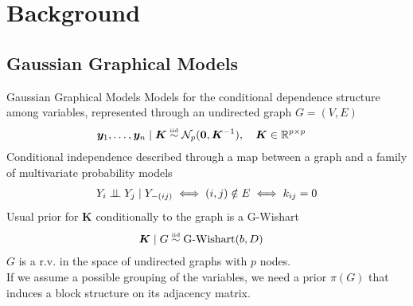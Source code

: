 

\section{Background}

\subsection{Gaussian Graphical Models}
\begin{frame}{Gaussian Graphical Models}
    Models for the \alert{conditional dependence structure} among variables, represented through an undirected graph $G=(V,E)$
    \begin{align*}
    \bm{y}_{1}, \ldots, \bm{y}_{n} \mid \bm{K} &\iid \mathcal{N}_{p}(\bm{0},\bm{K}^{-1}), \quad \bm{K} \in \mathbb{R}^{p\times p}  %
    \end{align*}
Conditional independence described through a \alert{map} between a \alert{graph} and a family of multivariate \alert{probability models}
\begin{align*}
Y_{i}\perp \!\!\! \perp Y_{j} \mid Y_{-(ij)} \iff (i,j) \notin E \iff k_{ij}=0
\end{align*}
Usual prior for $\bm{K}$ conditionally to the graph is a G-Wishart
\begin{align*}
    \bm{K} \mid G &\overset{\text{\tiny{iid}}}{\sim} \operatorname{G-Wishart}(b,D)
\end{align*}
$G$ is a r.v. in the space of undirected graphs with $p$ nodes.\\
If we assume a possible \alert{grouping} of the variables, we need a prior $\pi(G)$ that induces a \alert{block structure on its adjacency matrix}.
\end{frame}



 

